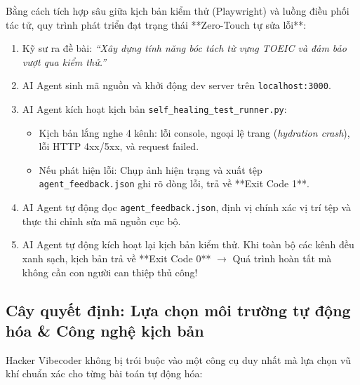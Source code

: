 \documentclass[a4paper,11pt]{article}
\begin{document}
Bằng cách tích hợp sâu giữa kịch bản kiểm thử (Playwright) và luồng điều phối tác tử, quy trình phát triển đạt trạng thái **Zero-Touch tự sửa lỗi**:

\begin{enumerate}[label={\arabic*.}]
    \item Kỹ sư ra đề bài: \textit{``Xây dựng tính năng bóc tách từ vựng TOEIC và đảm bảo vượt qua kiểm thử.''}
    \item AI Agent sinh mã nguồn và khởi động dev server trên \texttt{localhost:3000}.
    \item AI Agent kích hoạt kịch bản \texttt{self\_healing\_test\_runner.py}:
    \begin{itemize}
        \item Kịch bản lắng nghe 4 kênh: lỗi console, ngoại lệ trang (\textit{hydration crash}), lỗi HTTP 4xx/5xx, và request failed.
        \item Nếu phát hiện lỗi: Chụp ảnh hiện trạng và xuất tệp \texttt{agent\_feedback.json} ghi rõ dòng lỗi, trả về **Exit Code 1**.
    \end{itemize}
    \item AI Agent tự động đọc \texttt{agent\_feedback.json}, định vị chính xác vị trí tệp và thực thi chỉnh sửa mã nguồn cục bộ.
    \item AI Agent tự động kích hoạt lại kịch bản kiểm thử. Khi toàn bộ các kênh đều xanh sạch, kịch bản trả về **Exit Code 0** $\rightarrow$ Quá trình hoàn tất mà không cần con người can thiệp thủ công!
\end{enumerate}

\subsection{Cây quyết định: Lựa chọn môi trường tự động hóa \& Công nghệ kịch bản}

Hacker Vibecoder không bị trói buộc vào một công cụ duy nhất mà lựa chọn vũ khí chuẩn xác cho từng bài toán tự động hóa:
\end{document}
